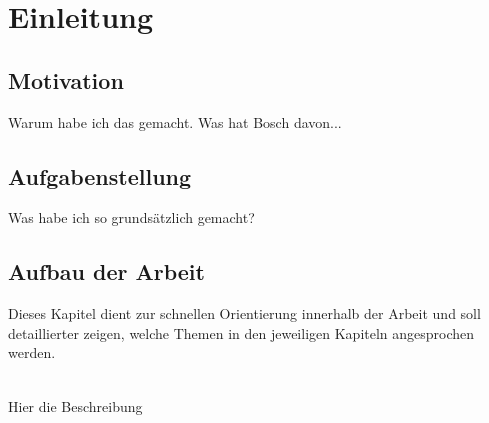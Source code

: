\chapter{Einleitung}
\label{ch:einleitung}

\section{Motivation}
\label{sec:motivation}
Warum habe ich das gemacht. Was hat Bosch davon...

\section{Aufgabenstellung}
\label{sec:aufgabenstellung}
Was habe ich so grundsätzlich gemacht?

\newpage


\section{Aufbau der Arbeit}
\label{sec:aufbauDerArbeit}
Dieses Kapitel dient zur schnellen Orientierung innerhalb der Arbeit und soll detaillierter zeigen, welche Themen in den
jeweiligen Kapiteln angesprochen werden.

\begin{description}

\item[Kapitel 2 (Grundlagen)]\hfill \\
Hier die Beschreibung
  \item
\end{description}